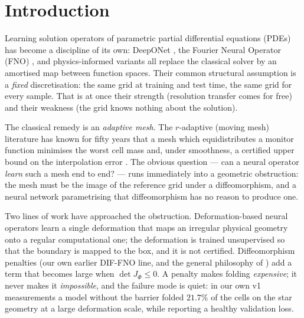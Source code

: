 \documentclass[11pt,a4paper]{article}
\theoremstyle{plain}
\theoremstyle{definition}
\newcommand{\detJ}{\det J_\Phi}
\begin{document}
\tableofcontents

\section{Introduction}

Learning solution operators of parametric partial differential equations
(PDEs) has become a discipline of its own: DeepONet
\cite{lu2021deeponet,lu2022fair}, the Fourier Neural Operator
(FNO) \cite{li2021fno,kovachki2023neuraloperator}, and physics-informed
variants \cite{raissi2019pinn,sirignano2018dgm,weinan2018deepritz} all replace
the classical solver by an amortised map between function spaces.  Their common
structural assumption is a \emph{fixed} discretisation: the same grid at
training and test time, the same grid for every sample.  That is at once their
strength (resolution transfer comes for free) and their weakness (the grid knows
nothing about the solution).

The classical remedy is an \emph{adaptive mesh}.  The $r$-adaptive (moving mesh)
literature \cite{huang2011moving,budd2009adaptivity,deboor1973good} has known for
fifty years that a mesh which equidistributes a monitor function minimises the
worst cell mass and, under smoothness, a certified upper bound on the
interpolation error \cite{babuska1978error}.  The obvious question — can a neural
operator \emph{learn} such a mesh end to end? — runs immediately into a
geometric obstruction: the mesh must be the image of the reference grid under a
diffeomorphism, and a neural network parametrising that diffeomorphism has no
reason to produce one.

Two lines of work have approached the obstruction.  Deformation-based neural
operators \cite{li2022geofno} learn a single deformation that maps an irregular
physical geometry onto a regular computational one; the deformation is trained
unsupervised so that the boundary is mapped to the box, and it is not certified.
Diffeomorphism penalties (our own earlier DIF-FNO line, and the general
philosophy of \cite{behrmann2019invertible}) add a term that becomes large when
$\detJ\le 0$.  A penalty makes folding \emph{expensive}; it never makes it
\emph{impossible}, and the failure mode is quiet: in our own v1 measurements a
model without the barrier folded $21.7\%$ of the cells on the star geometry at a
large deformation scale, while reporting a healthy validation loss.
\end{document}
